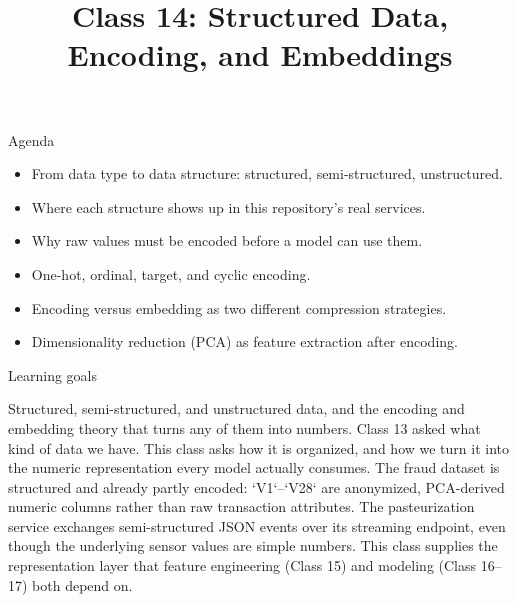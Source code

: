 

\title{Class 14: Structured Data, Encoding, and Embeddings}
\author{\coursename}
\date{}



\frame{\titlepage \coursefooter}

\begin{frame}{Agenda}
\begin{itemize}
\item From data type to data structure: structured, semi-structured, unstructured.
\item Where each structure shows up in this repository's real services.
\item Why raw values must be encoded before a model can use them.
\item One-hot, ordinal, target, and cyclic encoding.
\item Encoding versus embedding as two different compression strategies.
\item Dimensionality reduction (PCA) as feature extraction after encoding.
\end{itemize}
\coursefooter
\end{frame}

\begin{frame}{Learning goals}
\coursefooter
\end{frame}

\coursecontextframe
{Structured, semi-structured, and unstructured data, and the encoding and embedding theory that turns any of them into numbers.}
{Class 13 asked what kind of data we have. This class asks how it is organized, and how we turn it into the numeric representation every model actually consumes.}
{The fraud dataset is structured and already partly encoded: `V1`--`V28` are anonymized, PCA-derived numeric columns rather than raw transaction attributes.}
{The pasteurization service exchanges semi-structured JSON events over its streaming endpoint, even though the underlying sensor values are simple numbers.}
{This class supplies the representation layer that feature engineering (Class 15) and modeling (Class 16--17) both depend on.}

